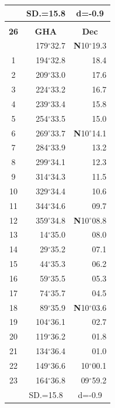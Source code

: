 \documentclass[10pt, a4paper]{report}
\begin{document}
\begin{scriptsize}
\begin{tabular*}{0.2\textwidth}[t]{@{\extracolsep{\fill}}|c|rr|}
\hline
\rule{0pt}{2.4ex} & \multicolumn{1}{c}{SD.=15.8} & \multicolumn{1}{c|}{d=-0.9}\\
\hline
\multicolumn{1}{c}{}\\[-0.5ex]\hline
\multicolumn{1}{|c|}{\rule{0pt}{2.6ex}\textbf{26}} & \multicolumn{1}{c}{\textbf{GHA}} & \multicolumn{1}{c|}{\textbf{Dec}}\\
\hline\rule{0pt}{2.6ex}\noindent
0 & 179$^\circ$32.7 & \textbf{N}10$^\circ$19.3\\
1 & 194$^\circ$32.8 & 18.4\\
2 & 209$^\circ$33.0 & 17.6\\
3 & 224$^\circ$33.2 & \raisebox{0.24ex}{\boldmath$\cdot$~\boldmath$\cdot$~~}16.7\\
4 & 239$^\circ$33.4 & 15.8\\
5 & 254$^\circ$33.5 & 15.0\\[2Pt]
6 & 269$^\circ$33.7 & \textbf{N}10$^\circ$14.1\\
7 & 284$^\circ$33.9 & 13.2\\
8 & 299$^\circ$34.1 & 12.3\\
9 & 314$^\circ$34.3 & \raisebox{0.24ex}{\boldmath$\cdot$~\boldmath$\cdot$~~}11.5\\
10 & 329$^\circ$34.4 & 10.6\\
11 & 344$^\circ$34.6 & 09.7\\[2Pt]
12 & 359$^\circ$34.8 & \textbf{N}10$^\circ$08.8\\
13 & 14$^\circ$35.0 & 08.0\\
14 & 29$^\circ$35.2 & 07.1\\
15 & 44$^\circ$35.3 & \raisebox{0.24ex}{\boldmath$\cdot$~\boldmath$\cdot$~~}06.2\\
16 & 59$^\circ$35.5 & 05.3\\
17 & 74$^\circ$35.7 & 04.5\\[2Pt]
18 & 89$^\circ$35.9 & \textbf{N}10$^\circ$03.6\\
19 & 104$^\circ$36.1 & 02.7\\
20 & 119$^\circ$36.2 & 01.8\\
21 & 134$^\circ$36.4 & \raisebox{0.24ex}{\boldmath$\cdot$~\boldmath$\cdot$~~}01.0\\
22 & 149$^\circ$36.6 & 10$^\circ$00.1\\
23 & 164$^\circ$36.8 & 09$^\circ$59.2\\
\hline
\rule{0pt}{2.4ex} & \multicolumn{1}{c}{SD.=15.8} & \multicolumn{1}{c|}{d=-0.9}\\
\hline
\end{tabular*}\noindent

\end{scriptsize}
\end{document}
